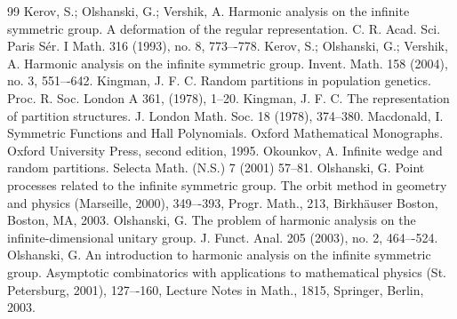 \documentclass[12pt]{amsart}
\theoremstyle{definition}
\numberwithin{equation}{section}
\begin{document}
\begin{thebibliography}{99}
Kerov, S.; Olshanski, G.; Vershik, A. Harmonic analysis on the infinite symmetric group. A deformation of the regular representation. C. R. Acad. Sci. Paris Sér. I Math. 316 (1993), no. 8, 773–-778.
Kerov, S.; Olshanski, G.; Vershik, A. Harmonic analysis on the infinite symmetric group. Invent. Math. 158 (2004), no. 3, 551–-642.
 Kingman, J. F. C. Random partitions in population genetics. Proc. R. Soc. London A 361, (1978), 1--20.
Kingman, J. F. C. The representation of partition structures. J. London Math. Soc. 18 (1978), 374--380.
 Macdonald, I. Symmetric Functions and Hall Polynomials. Oxford Mathematical Monographs. Oxford University Press, second edition, 1995.
Okounkov, A.  Infinite wedge and random partitions.
Selecta Math. (N.S.) 7 (2001) 57--81.
 Olshanski, G. Point processes related to the infinite symmetric group. The orbit method in geometry and physics (Marseille, 2000), 349–-393, Progr. Math., 213, Birkhäuser Boston, Boston, MA, 2003.
  Olshanski, G. The problem of harmonic analysis on the infinite-dimensional unitary group. J. Funct. Anal. 205 (2003), no. 2, 464–-524.
  Olshanski, G. An introduction to harmonic analysis on the infinite symmetric group. Asymptotic combinatorics with applications to mathematical physics (St. Petersburg, 2001), 127–-160, Lecture Notes in Math., 1815, Springer, Berlin, 2003.

\end{thebibliography}
\end{document}
